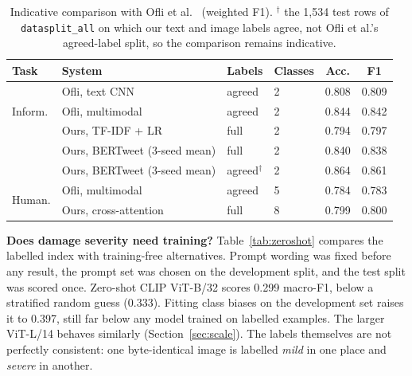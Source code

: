 \documentclass[conference]{IEEEtran}
\begin{document}
\begin{table}[t]
\centering
\caption{Indicative comparison with Ofli et al.~\cite{ofli2020} (weighted F1). $^{\dagger}$ the 1,534 test rows of \texttt{datasplit\_all} on which our text and image labels agree, not Ofli et al.'s agreed-label split, so the comparison remains indicative.}
\label{tab:ofli}
\footnotesize
\setlength{\tabcolsep}{3pt}
\begin{tabular}{llllcc}
\toprule
Task & System & Labels & Classes & Acc. & F1 \\
\midrule
\multirow{3}{*}{Inform.} & Ofli, text CNN & agreed & 2 & 0.808 & 0.809 \\
 & Ofli, multimodal & agreed & 2 & 0.844 & 0.842 \\
 & Ours, TF-IDF + LR & full & 2 & 0.794 & 0.797 \\
 & Ours, BERTweet (3-seed mean) & full & 2 & 0.840 & 0.838 \\
 & Ours, BERTweet (3-seed mean) & agreed$^{\dagger}$ & 2 & 0.864 & 0.861 \\
\midrule
\multirow{2}{*}{Human.} & Ofli, multimodal & agreed & 5 & 0.784 & 0.783 \\
 & Ours, cross-attention & full & 8 & 0.799 & 0.800 \\
\bottomrule
\end{tabular}
\end{table}

\textbf{Does damage severity need training?} Table~\ref{tab:zeroshot} compares the labelled index with training-free alternatives. Prompt wording was fixed before any result, the prompt set was chosen on the development split, and the test split was scored once. Zero-shot CLIP ViT-B/32 scores 0.299 macro-F1, below a stratified random guess (0.333). Fitting class biases on the development set raises it to 0.397, still far below any model trained on labelled examples. The larger ViT-L/14 behaves similarly (Section~\ref{sec:scale}). The labels themselves are not perfectly consistent: one byte-identical image is labelled \emph{mild} in one place and \emph{severe} in another.
\end{document}
